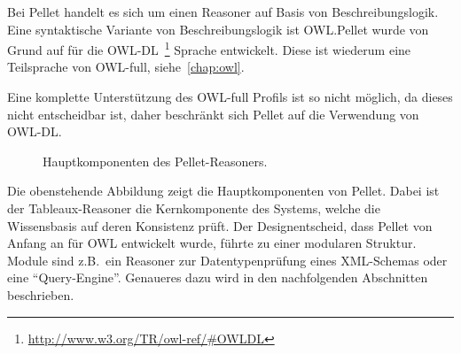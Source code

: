 Bei Pellet handelt es sich um einen Reasoner auf Basis von Beschreibungslogik. Eine syntaktische Variante von Beschreibungslogik ist OWL.\@ Pellet wurde von Grund auf für die OWL-DL~\footnote{\url{http://www.w3.org/TR/owl-ref/\#OWLDL}} Sprache entwickelt. Diese ist wiederum eine Teilsprache von OWL-full, siehe~\autoref{chap:owl}.

Eine komplette Unterstützung des OWL-full Profils ist so nicht möglich, da dieses nicht entscheidbar ist, daher beschränkt sich Pellet auf die Verwendung von OWL-DL\@.~\cite[Seite 13]{sirin:pellet05}

\begin{figure}[htbp]
\centering {}
\caption{Hauptkomponenten des Pellet-Reasoners.\label{fig:pellet_komponenten}\protect\footnotemark}
\end{figure}

Die obenstehende Abbildung zeigt die Hauptkomponenten von Pellet. Dabei ist der Tableaux-Reasoner die Kernkomponente des Systems, welche die Wissensbasis auf deren Konsistenz prüft. Der Designentscheid, dass Pellet von Anfang an für OWL entwickelt wurde, führte zu einer modularen Struktur. Module sind z.B.\ ein Reasoner zur Datentypenprüfung eines XML-Schemas oder eine ``Query-Engine''. Genaueres dazu wird in den nachfolgenden Abschnitten beschrieben.

